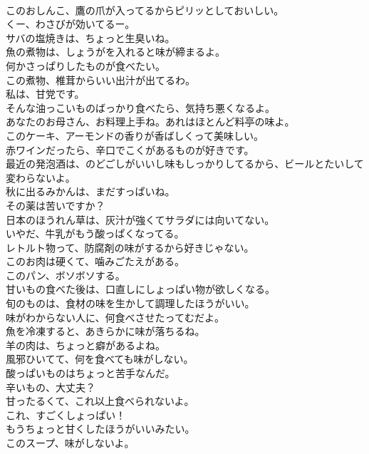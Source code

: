 \documentclass[8pt]{extreport}
\begin{document}
\begin{CJK}{UTF8}{min}
\\	このおしんこ、鷹の爪が入ってるからピリッとしておいしい。	
\\	くー、わさびが効いてるー。	
\\	サバの塩焼きは、ちょっと生臭いね。	
\\	魚の煮物は、しょうがを入れると味が締まるよ。	
\\	何かさっぱりしたものが食べたい。	
\\	この煮物、椎茸からいい出汁が出てるわ。	
\\	私は、甘党です。	
\\	そんな油っこいものばっかり食べたら、気持ち悪くなるよ。	
\\	あなたのお母さん、お料理上手ね。あれはほとんど料亭の味よ。	
\\	このケーキ、アーモンドの香りが香ばしくって美味しい。	
\\	赤ワインだったら、辛口でこくがあるものが好きです。	
\\	最近の発泡酒は、のどごしがいいし味もしっかりしてるから、ビールとたいして変わらないよ。	
\\	秋に出るみかんは、まだすっぱいね。	
\\	その薬は苦いですか？	
\\	日本のほうれん草は、灰汁が強くてサラダには向いてない。	
\\	いやだ、牛乳がもう酸っぱくなってる。	
\\	レトルト物って、防腐剤の味がするから好きじゃない。	
\\	このお肉は硬くて、噛みごたえがある。	
\\	このパン、ボソボソする。	
\\	甘いもの食べた後は、口直しにしょっぱい物が欲しくなる。	
\\	旬のものは、食材の味を生かして調理したほうがいい。	
\\	味がわからない人に、何食べさせたってむだよ。	
\\	魚を冷凍すると、あきらかに味が落ちるね。	
\\	羊の肉は、ちょっと癖があるよね。	
\\	風邪ひいてて、何を食べても味がしない。	
\\	酸っぱいものはちょっと苦手なんだ。	
\\	辛いもの、大丈夫？	
\\	甘ったるくて、これ以上食べられないよ。	
\\	これ、すごくしょっぱい！	
\\	もうちょっと甘くしたほうがいいみたい。	
\\	このスープ、味がしないよ。	

\end{CJK}
\end{document}
